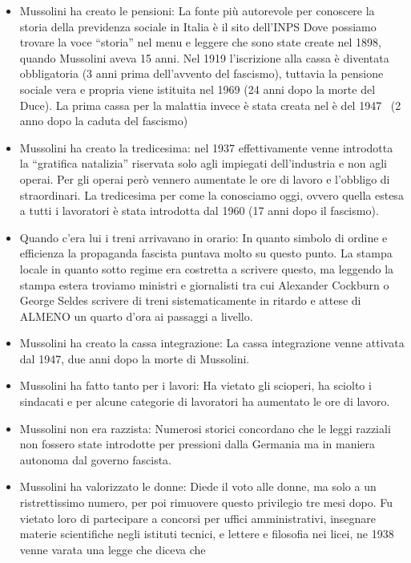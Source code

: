 \documentclass[12pt]{book} %
\begin{document}
\begin{itemize}
\item Mussolini ha creato le pensioni: La fonte più autorevole per conoscere la storia della previdenza sociale in
Italia è il sito dell'INPS Dove possiamo trovare la voce “storia”
nel menu e leggere che sono state create nel 1898, quando Mussolini aveva 15 anni. Nel 1919
l'iscrizione alla cassa è diventata obbligatoria (3 anni prima dell'avvento
del fascismo), tuttavia la pensione sociale vera e propria viene istituita nel 1969 (24 anni dopo la morte del Duce).
La prima cassa per la malattia invece è stata creata nel è del 1947 \ (2 anno dopo la caduta del fascismo)
\item Mussolini ha creato la tredicesima: nel 1937 effettivamente venne introdotta la “gratifica natalizia” riservata
solo agli impiegati dell'industria e non agli operai. Per gli operai però vennero aumentate le ore
di lavoro e l'obbligo di straordinari. La tredicesima per come la conosciamo oggi, ovvero quella
estesa a tutti i lavoratori è stata introdotta dal 1960 (17 anni dopo il fascismo).
\item Quando c'era lui i treni arrivavano in orario: In quanto simbolo di ordine e efficienza la
propaganda fascista puntava molto su questo punto. La stampa locale in quanto sotto regime era costretta a scrivere
questo, ma leggendo la stampa estera troviamo ministri e giornalisti tra cui Alexander Cockburn o George Seldes
scrivere di treni sistematicamente in ritardo e attese di ALMENO un quarto d'ora ai passaggi a
livello.
\item Mussolini ha creato la cassa integrazione: La cassa integrazione venne attivata dal 1947, due anni dopo la morte
di Mussolini.
\item Mussolini ha fatto tanto per i lavori: Ha vietato gli scioperi, ha sciolto i sindacati e per alcune categorie di
lavoratori ha aumentato le ore di lavoro.
\item Mussolini non era razzista: Numerosi storici concordano che le leggi razziali non fossero state introdotte per
pressioni dalla Germania ma in maniera autonoma dal governo fascista.
\item Mussolini ha valorizzato le donne: Diede il voto alle donne, ma solo a un ristrettissimo numero, per poi rimuovere
questo privilegio tre mesi dopo. Fu vietato loro di partecipare a concorsi per uffici amministrativi, insegnare materie
scientifiche negli istituti tecnici, e lettere e filosofia nei licei, ne 1938 venne varata una legge che diceva che

\end{itemize}
\end{document}
